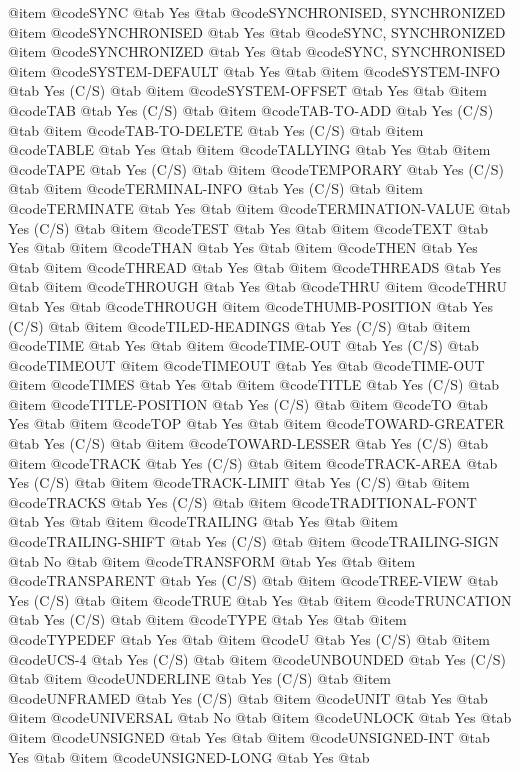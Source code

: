 @item @code{SYNC} @tab Yes @tab @code{SYNCHRONISED, SYNCHRONIZED}
@item @code{SYNCHRONISED} @tab Yes @tab @code{SYNC, SYNCHRONIZED}
@item @code{SYNCHRONIZED} @tab Yes @tab @code{SYNC, SYNCHRONISED}
@item @code{SYSTEM-DEFAULT} @tab Yes @tab 
@item @code{SYSTEM-INFO} @tab Yes	(C/S) @tab 
@item @code{SYSTEM-OFFSET} @tab Yes @tab 
@item @code{TAB} @tab Yes	(C/S) @tab 
@item @code{TAB-TO-ADD} @tab Yes	(C/S) @tab 
@item @code{TAB-TO-DELETE} @tab Yes	(C/S) @tab 
@item @code{TABLE} @tab Yes @tab 
@item @code{TALLYING} @tab Yes @tab 
@item @code{TAPE} @tab Yes	(C/S) @tab 
@item @code{TEMPORARY} @tab Yes	(C/S) @tab 
@item @code{TERMINAL-INFO} @tab Yes	(C/S) @tab 
@item @code{TERMINATE} @tab Yes @tab 
@item @code{TERMINATION-VALUE} @tab Yes	(C/S) @tab 
@item @code{TEST} @tab Yes @tab 
@item @code{TEXT} @tab Yes @tab 
@item @code{THAN} @tab Yes @tab 
@item @code{THEN} @tab Yes @tab 
@item @code{THREAD} @tab Yes @tab 
@item @code{THREADS} @tab Yes @tab 
@item @code{THROUGH} @tab Yes @tab @code{THRU}
@item @code{THRU} @tab Yes @tab @code{THROUGH}
@item @code{THUMB-POSITION} @tab Yes	(C/S) @tab 
@item @code{TILED-HEADINGS} @tab Yes	(C/S) @tab 
@item @code{TIME} @tab Yes @tab 
@item @code{TIME-OUT} @tab Yes	(C/S) @tab @code{TIMEOUT}
@item @code{TIMEOUT} @tab Yes @tab @code{TIME-OUT}
@item @code{TIMES} @tab Yes @tab 
@item @code{TITLE} @tab Yes	(C/S) @tab 
@item @code{TITLE-POSITION} @tab Yes	(C/S) @tab 
@item @code{TO} @tab Yes @tab 
@item @code{TOP} @tab Yes @tab 
@item @code{TOWARD-GREATER} @tab Yes	(C/S) @tab 
@item @code{TOWARD-LESSER} @tab Yes	(C/S) @tab 
@item @code{TRACK} @tab Yes	(C/S) @tab 
@item @code{TRACK-AREA} @tab Yes	(C/S) @tab 
@item @code{TRACK-LIMIT} @tab Yes	(C/S) @tab 
@item @code{TRACKS} @tab Yes	(C/S) @tab 
@item @code{TRADITIONAL-FONT} @tab Yes @tab 
@item @code{TRAILING} @tab Yes @tab 
@item @code{TRAILING-SHIFT} @tab Yes	(C/S) @tab 
@item @code{TRAILING-SIGN} @tab No @tab 
@item @code{TRANSFORM} @tab Yes @tab 
@item @code{TRANSPARENT} @tab Yes	(C/S) @tab 
@item @code{TREE-VIEW} @tab Yes	(C/S) @tab 
@item @code{TRUE} @tab Yes @tab 
@item @code{TRUNCATION} @tab Yes	(C/S) @tab 
@item @code{TYPE} @tab Yes @tab 
@item @code{TYPEDEF} @tab Yes @tab 
@item @code{U} @tab Yes	(C/S) @tab 
@item @code{UCS-4} @tab Yes	(C/S) @tab 
@item @code{UNBOUNDED} @tab Yes	(C/S) @tab 
@item @code{UNDERLINE} @tab Yes	(C/S) @tab 
@item @code{UNFRAMED} @tab Yes	(C/S) @tab 
@item @code{UNIT} @tab Yes @tab 
@item @code{UNIVERSAL} @tab No @tab 
@item @code{UNLOCK} @tab Yes @tab 
@item @code{UNSIGNED} @tab Yes @tab 
@item @code{UNSIGNED-INT} @tab Yes @tab 
@item @code{UNSIGNED-LONG} @tab Yes @tab 
